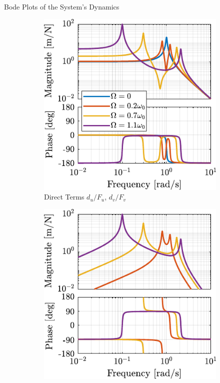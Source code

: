 \documentclass[t, minted]{clean-beamer}
\begin{document}
\begin{frame}[label={sec:orge87dc7b}]{Bode Plots of the System's Dynamics}
\begin{figure}[htbp]
\begin{subfigure}[c]{0.45\linewidth}
\includegraphics[width=\linewidth]{figs/plant_compare_rotating_speed_direct.pdf}
\caption{\label{fig:plant_compare_rotating_speed_direct} Direct Terms \(d_u/F_u\), \(d_v/F_v\)}
\end{subfigure}
\hfill
\begin{subfigure}[c]{0.45\linewidth}
\includegraphics[width=\linewidth]{figs/plant_compare_rotating_speed_coupling.pdf}

\end{subfigure}
\end{figure}
\end{frame}
\end{document}
